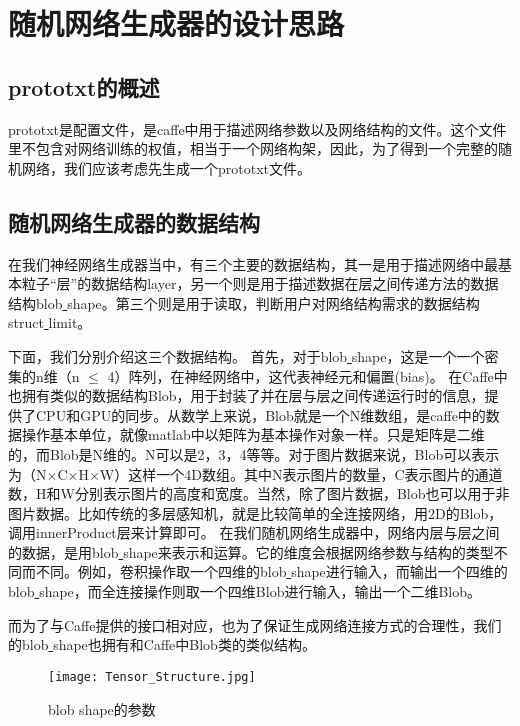 ﻿\chapter{随机网络生成器的设计思路}

\section{prototxt的概述}
prototxt是配置文件，是caffe中用于描述网络参数以及网络结构的文件。这个文件里不包含对网络训练的权值，相当于一个网络构架，因此，为了得到一个完整的随机网络，我们应该考虑先生成一个prototxt文件。

\section{随机网络生成器的数据结构}
在我们神经网络生成器当中，有三个主要的数据结构，其一是用于描述网络中最基本粒子“层”的数据结构layer，另一个则是用于描述数据在层之间传递方法的数据结构blob\underline{ }shape。第三个则是用于读取，判断用户对网络结构需求的数据结构struct\underline{ }limit。

下面，我们分别介绍这三个数据结构。
首先，对于blob\underline{ }shape，这是一个一个密集的n维（n $\leq$ 4）阵列，在神经网络中，这代表神经元和偏置(bias)。
在Caffe中也拥有类似的数据结构Blob，用于封装了并在层与层之间传递运行时的信息，提供了CPU和GPU的同步。从数学上来说，Blob就是一个N维数组，是caffe中的数据操作基本单位，就像matlab中以矩阵为基本操作对象一样。只是矩阵是二维的，而Blob是N维的。N可以是2，3，4等等。对于图片数据来说，Blob可以表示为（N$\times$C$\times$H$\times$W）这样一个4D数组。其中N表示图片的数量，C表示图片的通道数，H和W分别表示图片的高度和宽度。当然，除了图片数据，Blob也可以用于非图片数据。比如传统的多层感知机，就是比较简单的全连接网络，用2D的Blob，调用innerProduct层来计算即可。
在我们随机网络生成器中，网络内层与层之间的数据，是用blob\underline{ }shape来表示和运算。它的维度会根据网络参数与结构的类型不同而不同。例如，卷积操作取一个四维的blob\underline{ }shape进行输入，而输出一个四维的blob\underline{ }shape，而全连接操作则取一个四维Blob进行输入，输出一个二维Blob。

而为了与Caffe提供的接口相对应，也为了保证生成网络连接方式的合理性，我们的blob\underline{ }shape也拥有和Caffe中Blob类的类似结构。

\begin{figure}[!htbp]
\centering
\texttt{[image: Tensor\_Structure.jpg]}
\caption{blob shape的参数}
\label{fig:Tensor_Structure}
\end{figure}

